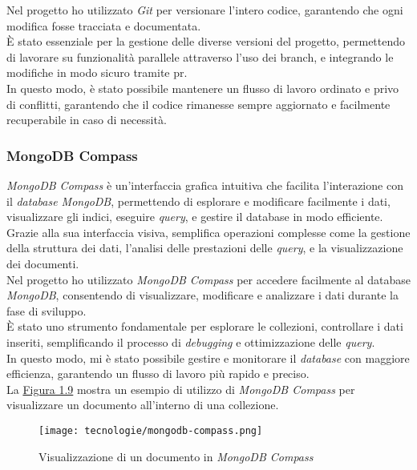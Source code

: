 \noindent Nel progetto ho utilizzato \textit{Git} per versionare l'intero codice, garantendo che ogni modifica fosse tracciata e documentata. \\
È stato essenziale per la gestione delle diverse versioni del progetto, permettendo di lavorare su funzionalità parallele attraverso l'uso dei \gls{branch}, e integrando le modifiche in modo sicuro tramite \gls{pr}. \\
In questo modo, è stato possibile mantenere un flusso di lavoro ordinato e privo di conflitti, garantendo che il codice rimanesse sempre aggiornato e facilmente recuperabile in caso di necessità. 

\subsubsection{MongoDB Compass}

\textit{MongoDB Compass} è un'interfaccia grafica intuitiva che facilita l'interazione con il \textit{database MongoDB}, permettendo di esplorare e modificare facilmente i dati, visualizzare gli indici, eseguire \textit{query}, e gestire il database in modo efficiente.\\
Grazie alla sua interfaccia visiva, semplifica operazioni complesse come la gestione della struttura dei dati, l'analisi delle prestazioni delle \textit{query}, e la visualizzazione dei documenti.\\

\noindent Nel progetto ho utilizzato \textit{MongoDB Compass}  per accedere facilmente al database \textit{MongoDB}, consentendo di visualizzare, modificare e analizzare i dati durante la fase di sviluppo.\\
È stato uno strumento fondamentale per esplorare le collezioni, controllare i dati inseriti, semplificando il processo di \textit{debugging} e ottimizzazione delle \textit{query}.\\
In questo modo, mi è stato possibile gestire e monitorare il \textit{database} con maggiore efficienza, garantendo un flusso di lavoro più rapido e preciso.\\

\noindent La {\hyperref[fig:mongodb-compass]{Figura 1.9}} mostra un esempio di utilizzo di \textit{MongoDB Compass} per visualizzare un documento all'interno di una collezione.

\begin{figure}[H]
    \label{fig:mongodb-compass}
    \centering
    \texttt{[image: tecnologie/mongodb-compass.png]}
    \caption{Visualizzazione di un documento in \textit{MongoDB Compass}}
\end{figure}
